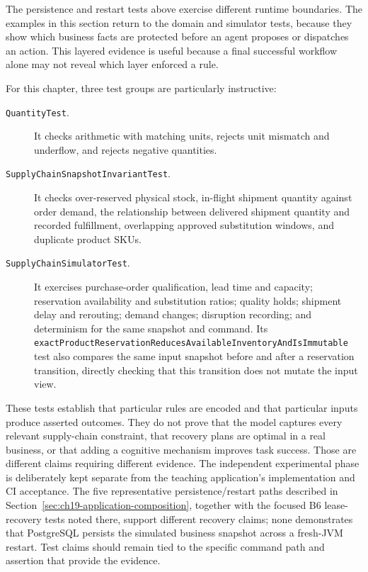 The persistence and restart tests above exercise different runtime boundaries. The examples in this section return to the domain and simulator tests, because they show which business facts are protected before an agent proposes or dispatches an action. This layered evidence is useful because a final successful workflow alone may not reveal which layer enforced a rule.

For this chapter, three test groups are particularly instructive:

\begin{description}
  \item[\texttt{QuantityTest}.] It checks arithmetic with matching units, rejects unit mismatch and underflow, and rejects negative quantities.
  \item[\texttt{SupplyChainSnapshotInvariantTest}.] It checks over-reserved physical stock, in-flight shipment quantity against order demand, the relationship between delivered shipment quantity and recorded fulfillment, overlapping approved substitution windows, and duplicate product SKUs.
  \item[\texttt{SupplyChainSimulatorTest}.] It exercises purchase-order qualification, lead time and capacity; reservation availability and substitution ratios; quality holds; shipment delay and rerouting; demand changes; disruption recording; and determinism for the same snapshot and command. Its \texttt{exactProductReservation\allowbreak{}Reduces}\allowbreak\texttt{Available\allowbreak{}Inventory}\allowbreak\texttt{AndIsImmutable} test also compares the same input snapshot before and after a reservation transition, directly checking that this transition does not mutate the input view.
\end{description}

These tests establish that particular rules are encoded and that particular inputs produce asserted outcomes. They do not prove that the model captures every relevant supply-chain constraint, that recovery plans are optimal in a real business, or that adding a cognitive mechanism improves task success. Those are different claims requiring different evidence. The independent experimental phase is deliberately kept separate from the teaching application's implementation and CI acceptance. The five representative persistence/restart paths described in Section~\ref{sec:ch19-application-composition}, together with the focused B6 lease-recovery tests noted there, support different recovery claims; none demonstrates that PostgreSQL persists the simulated business snapshot across a fresh-JVM restart. Test claims should remain tied to the specific command path and assertion that provide the evidence.

